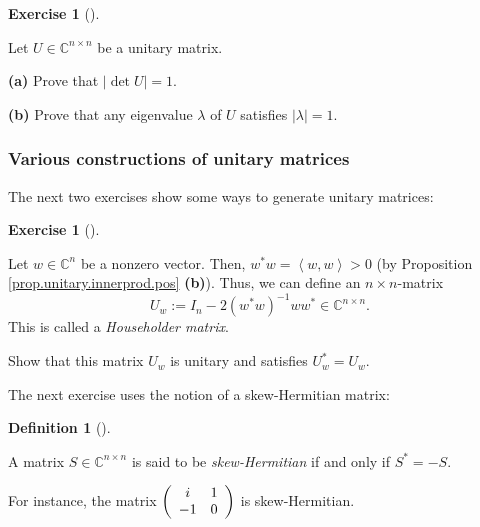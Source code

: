 \documentclass[numbers=enddot,12pt,final,onecolumn,notitlepage]{scrartcl}%
\newcounter{exer}
\numberwithin{exer}{subsection}
\theoremstyle{definition}
\newtheorem{defi}[theo]{Definition}
\newenvironment{definition}[1][]
{\begin{defi}[#1]\begin{leftbar}}
{\end{leftbar}\end{defi}}
\newtheorem{exmp}[exer]{Exercise}
\newenvironment{exercise}[1][]
{\begin{exmp}[#1]\begin{leftbar}}
{\end{leftbar}\end{exmp}}
\begin{document}
\begin{exercise}
\label{exe.unitary.det-eval} Let $U\in\mathbb{C}^{n\times n}$ be a
unitary matrix.

\textbf{(a)} Prove that $\left\vert \det U\right\vert =1$.

\textbf{(b)} Prove that any eigenvalue $\lambda$ of $U$ satisfies $\left\vert
\lambda\right\vert =1$.
\end{exercise}

\subsubsection{Various constructions of unitary matrices}

The next two exercises show some ways to generate unitary matrices:

\begin{exercise}
\label{exe.unitary.house} Let $w\in\mathbb{C}^{n}$ be a nonzero
vector. Then, $w^{\ast}w=\left\langle w,w\right\rangle >0$ (by Proposition
\ref{prop.unitary.innerprod.pos} \textbf{(b)}). Thus, we can define an
$n\times n$-matrix
\[
U_{w}:=I_{n}-2\left(  w^{\ast}w\right)  ^{-1}ww^{\ast}\in\mathbb{C}^{n\times
n}.
\]
This is called a \emph{Householder matrix}.

Show that this matrix $U_{w}$ is unitary and satisfies $U_{w}^{\ast}=U_{w}$.
\end{exercise}

The next exercise uses the notion of a skew-Hermitian matrix:

\begin{definition}
\label{def.unitary.skew-herm}A matrix $S\in\mathbb{C}^{n\times n}$ is said to
be \emph{skew-Hermitian} if and only if $S^{\ast}=-S$.
\end{definition}

For instance, the matrix $\left(
\begin{array}
[c]{cc}%
i & 1\\
-1 & 0
\end{array}
\right)  $ is skew-Hermitian.
\end{document}
